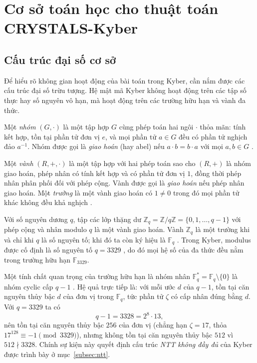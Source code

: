 \documentclass[../LuanVan.tex]{subfiles}
\begin{document}
\section{Cơ sở toán học cho thuật toán CRYSTALS-Kyber}\label{sec:toanhoc}
\subsection{Cấu trúc đại số cơ sở}\label{subsec:algebra}

Để hiểu rõ không gian hoạt động của bài toán trong Kyber, cần nắm được các cấu trúc đại số trừu tượng. Hệ mật mã Kyber không hoạt động trên các tập số thực hay số nguyên vô hạn, mà hoạt động trên các trường hữu hạn và vành đa thức.

\begin{dn}
    Một \textit{nhóm} $(G,\cdot)$ là một tập hợp $G$ cùng phép toán hai ngôi $\cdot$ thỏa mãn: tính kết hợp, tồn tại phần tử đơn vị $e$, và mọi phần tử $a \in G$ đều có phần tử nghịch đảo $a^{-1}$. Nhóm được gọi là \textit{giao hoán} (hay abel) nếu $a\cdot b = b \cdot a$ với mọi $a,b\in G$ \cite{DummitFoote04}.
\end{dn}

\begin{dn}
    Một \textit{vành} $(R,+,\cdot)$ là một tập hợp với hai phép toán sao cho $(R,+)$ là nhóm giao hoán, phép nhân có tính kết hợp và có phần tử đơn vị $1$, đồng thời phép nhân phân phối đối với phép cộng. Vành được gọi là \textit{giao hoán} nếu phép nhân giao hoán. Một \textit{trường} là một vành giao hoán có $1 \neq 0$ trong đó mọi phần tử khác không đều khả nghịch \cite{DummitFoote04}.
\end{dn}

Với số nguyên dương $q$, tập các lớp thặng dư $\mathbb{Z}_q = \mathbb{Z}/q\mathbb{Z} = \{0,1,\dots,q-1\}$ với phép cộng và nhân modulo $q$ là một vành giao hoán. Vành $\mathbb{Z}_q$ là một trường khi và chỉ khi $q$ là số nguyên tố; khi đó ta còn ký hiệu là $\mathbb{F}_q$ \cite{LidlNiederreiter97}. Trong Kyber, modulus được cố định là số nguyên tố $q = 3329$ \cite{Avanzi21,FIPS203}, do đó mọi hệ số của đa thức đều nằm trong trường hữu hạn $\mathbb{F}_{3329}$.

Một tính chất quan trọng của trường hữu hạn là nhóm nhân $\mathbb{F}_q^{*} = \mathbb{F}_q\setminus\{0\}$ là nhóm cyclic cấp $q-1$ \cite{LidlNiederreiter97}. Hệ quả trực tiếp là: với mỗi ước $d$ của $q-1$, tồn tại căn nguyên thủy bậc $d$ của đơn vị trong $\mathbb{F}_q$, tức phần tử $\zeta$ có cấp nhân đúng bằng $d$. Với $q=3329$ ta có
\begin{equation}\label{eq:q1}
    q - 1 = 3328 = 2^8 \cdot 13,
\end{equation}
nên tồn tại căn nguyên thủy bậc $256$ của đơn vị (chẳng hạn $\zeta = 17$, thỏa $17^{128}\equiv -1 \pmod{3329}$), nhưng không tồn tại căn nguyên thủy bậc $512$ vì $512 \nmid 3328$. Chính sự kiện này quyết định cấu trúc \textit{NTT không đầy đủ} của Kyber được trình bày ở mục~\ref{subsec:ntt}.
\end{document}
